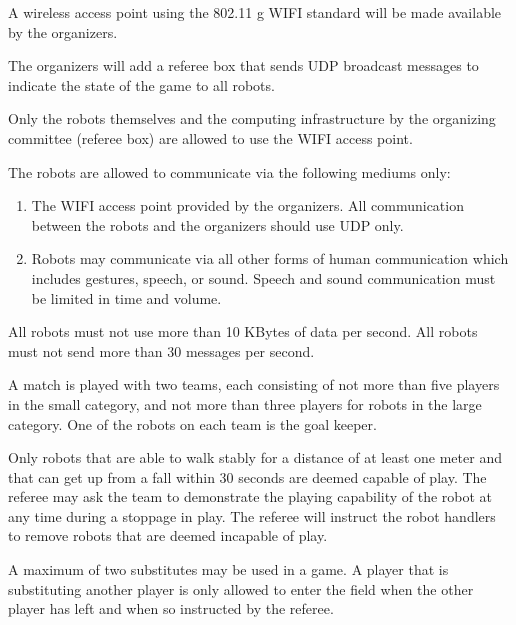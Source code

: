\documentclass[12pt]{hurocup}
\begin{document}
\label{law:communication}

\begin{lawlist}[US]

\item A wireless access point using the 802.11 g WIFI standard will be
  made available by the organizers.

\item The organizers will add a referee box that sends UDP broadcast
  messages to indicate the state of the game to all robots.

\item Only the robots themselves and the computing infrastructure by
  the organizing committee (referee box) are allowed to use the WIFI
  access point.

\item The robots are allowed to communicate via the following mediums
  only:
  \begin{enumerate}
  \item The WIFI access point provided by the organizers. All
    communication between the robots and the organizers should use
    UDP only.
  \item Robots may communicate via all other forms of human
    communication which includes gestures, speech, or sound. Speech
    and sound communication must be limited in time and volume.
  \end{enumerate}

\item \label{comm-limits} All robots must not use more than 10 KBytes
  of data per second. All robots must not send more than 30 messages
  per second.

\end{lawlist}


\begin{lawlist}[US]
\item A match is played with two teams, each consisting of not more
  than five players in the small category, and not more than three
  players for robots in the large category. One of the robots on each
  team is the goal keeper.

\item Only robots that are able to walk stably for a distance of at
  least one meter and that can get up from a fall within 30 seconds
  are deemed capable of play. The referee may ask the team to
  demonstrate the playing capability of the robot at any time during a
  stoppage in play. The referee will instruct the robot handlers to
  remove robots that are deemed incapable of play.

\item A maximum of two substitutes may be used in a game. A player
  that is substituting another player is only allowed to enter the
  field when the other player has left and when so instructed by the
  referee.

\end{lawlist}
\end{document}
